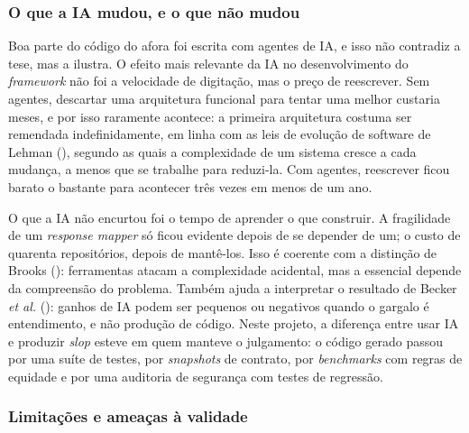 \documentclass[a4paper,12pt]{article}
\newcommand{\estr}[1]{\textit{#1}}
\begin{document}
\subsubsection{O que a IA mudou, e o que não mudou}

Boa parte do código do afora foi escrita com agentes de IA, e isso não contradiz a tese, mas a ilustra. O efeito mais relevante da IA no desenvolvimento do \estr{framework} não foi a velocidade de digitação, mas o preço de reescrever. Sem agentes, descartar uma arquitetura funcional para tentar uma melhor custaria meses, e por isso raramente acontece: a primeira arquitetura costuma ser remendada indefinidamente, em linha com as leis de evolução de software de Lehman (\citeyear{lehman1980}), segundo as quais a complexidade de um sistema cresce a cada mudança, a menos que se trabalhe para reduzi-la. Com agentes, reescrever ficou barato o bastante para acontecer três vezes em menos de um ano.

O que a IA não encurtou foi o tempo de aprender o que construir. A fragilidade de um \estr{response mapper} só ficou evidente depois de se depender de um; o custo de quarenta repositórios, depois de mantê-los. Isso é coerente com a distinção de Brooks (\citeyear{brooks1987}): ferramentas atacam a complexidade acidental, mas a essencial depende da compreensão do problema. Também ajuda a interpretar o resultado de Becker \textit{et al.} (\citeyear{becker2025}): ganhos de IA podem ser pequenos ou negativos quando o gargalo é entendimento, e não produção de código. Neste projeto, a diferença entre usar IA e produzir \estr{slop} esteve em quem manteve o julgamento: o código gerado passou por uma suíte de testes, por \estr{snapshots} de contrato, por \estr{benchmarks} com regras de equidade e por uma auditoria de segurança com testes de regressão.

\subsubsection{Limitações e ameaças à validade}
\end{document}
